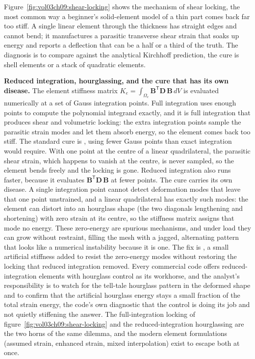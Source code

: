 Figure~\ref{fig:vol03ch09:shear-locking} shows the mechanism of shear
locking, the most common way a beginner's solid-element model of a
thin part comes back far too stiff. A single linear element through the
thickness has straight edges and cannot bend; it manufactures a
parasitic transverse shear strain that soaks up energy and reports a
deflection that can be a half or a third of the truth. The diagnosis
is to compare against the analytical Kirchhoff prediction, the cure is
shell elements or a stack of quadratic elements.

\begin{mastery}
\textbf{Reduced integration, hourglassing, and the cure that has its own
disease.} The element stiffness matrix $K_e = \int_{\Omega_e}
\mathbf{B}^{\mathsf T}\mathbf{D}\,\mathbf{B}\,dV$ is evaluated numerically at
a set of Gauss integration points. Full integration uses enough points to
compute the polynomial integrand exactly, and it is full integration that
produces shear and volumetric locking: the extra integration points sample
the parasitic strain modes and let them absorb energy, so the element comes
back too stiff. The standard cure is , using
fewer Gauss points than exact integration would require. With one point at
the centre of a linear quadrilateral, the parasitic shear strain, which
happens to vanish at the centre, is never sampled, so the element bends
freely and the locking is gone. Reduced integration also runs faster,
because it evaluates $\mathbf{B}^{\mathsf T}\mathbf{D}\,\mathbf{B}$ at fewer
points. The cure carries its own disease. A single integration point cannot
detect deformation modes that leave that one point unstrained, and a linear
quadrilateral has exactly such modes: the element can distort into an
hourglass shape (the two diagonals lengthening and shortening) with zero
strain at its centre, so the stiffness matrix assigns that mode no energy.
These zero-energy  are spurious mechanisms, and
under load they can grow without restraint, filling the mesh with a
jagged, alternating pattern that looks like a numerical instability because
it is one. The fix is , a small artificial
stiffness added to resist the zero-energy modes without restoring the
locking that reduced integration removed. Every commercial code offers
reduced-integration elements with hourglass control as its workhorse, and
the analyst's responsibility is to watch for the tell-tale hourglass pattern
in the deformed shape and to confirm that the artificial hourglass energy
stays a small fraction of the total strain energy, the code's own diagnostic
that the control is doing its job and not quietly stiffening the answer. The
full-integration locking of figure~\ref{fig:vol03ch09:shear-locking} and the
reduced-integration hourglassing are the two horns of the same dilemma, and
the modern element formulations (assumed strain, enhanced strain, mixed
interpolation) exist to escape both at once.
\end{mastery}


